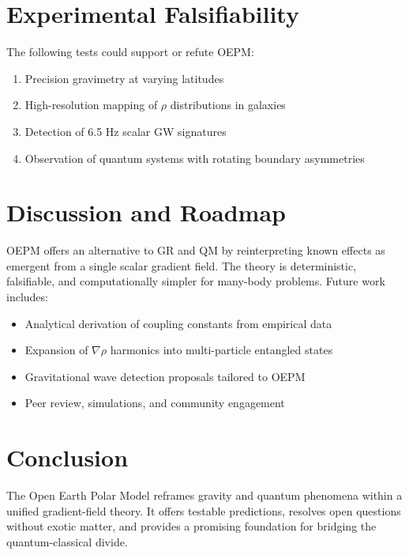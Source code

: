 \documentclass[12pt]{article}
\begin{document}
\section{Experimental Falsifiability}
The following tests could support or refute OEPM:
\begin{enumerate}
    \item Precision gravimetry at varying latitudes
    \item High-resolution mapping of $\rho$ distributions in galaxies
    \item Detection of 6.5 Hz scalar GW signatures
    \item Observation of quantum systems with rotating boundary asymmetries
\end{enumerate}

\section{Discussion and Roadmap}
OEPM offers an alternative to GR and QM by reinterpreting known effects as emergent from a single scalar gradient field. The theory is deterministic, falsifiable, and computationally simpler for many-body problems. Future work includes:
\begin{itemize}
    \item Analytical derivation of coupling constants from empirical data
    \item Expansion of $\nabla\rho$ harmonics into multi-particle entangled states
    \item Gravitational wave detection proposals tailored to OEPM
    \item Peer review, simulations, and community engagement
\end{itemize}

\section{Conclusion}
The Open Earth Polar Model reframes gravity and quantum phenomena within a unified gradient-field theory. It offers testable predictions, resolves open questions without exotic matter, and provides a promising foundation for bridging the quantum-classical divide.



\end{document}
